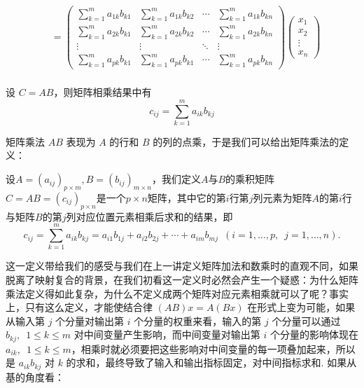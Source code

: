 \begin{align*}
    &= \begin{pmatrix}
        \sum_{k=1}^m a_{1k} b_{k1} & \sum_{k=1}^m a_{1k} b_{k2} & \cdots & \sum_{k=1}^m a_{1k} b_{kn} \\
        \sum_{k=1}^m a_{2k} b_{k1} & \sum_{k=1}^m a_{2k} b_{k2} & \cdots & \sum_{k=1}^m a_{2k} b_{kn} \\
        \vdots & \vdots & \ddots & \vdots \\
        \sum_{k=1}^m a_{pk} b_{k1} & \sum_{k=1}^m a_{pk} b_{k1} & \cdots & \sum_{k=1}^m a_{pk} b_{kn}
    \end{pmatrix} \begin{pmatrix}
        x_1 \\ x_2 \\ \vdots \\ x_n
    \end{pmatrix}\\
\end{align*}

设 $C = AB$，则矩阵相乘结果中有
\[
    c_{ij} = \sum_{k=1}^m a_{ik} b_{kj}
\]

矩阵乘法 $AB$ 表现为 $A$ 的行和 $B$ 的列的点乘，于是我们可以给出矩阵乘法的定义：
\begin{definition}{}{}
    设$A=(a_{ij})_{p\times m},B=(b_{ij})_{m\times n}$，我们定义$A$与$B$的乘积矩阵$C=AB=(c_{ij})_{p\times n}$是一个$p\times n$矩阵，其中它的第$i$行第$j$列元素为矩阵$A$的第$i$行与矩阵$B$的第$j$列对应位置元素相乘后求和的结果，即
    \[
        c_{ij}
        =\sum_{k=1}^m a_{ik} b_{kj}
        =a_{i1}b_{1j}+a_{i2}b_{2j}+\cdots+a_{im}b_{mj}\enspace(i=1,\ldots,p,\enspace j=1,\ldots,n).
    \]
\end{definition}

这一定义带给我们的感受与我们在上一讲定义矩阵加法和数乘时的直观不同，如果脱离了映射复合的背景，在我们初看这一定义时必然会产生一个疑惑：为什么矩阵乘法定义得如此复杂，为什么不定义成两个矩阵对应元素相乘就可以了呢？事实上，只有这么定义，才能使结合律 $(AB)x = A(Bx)$ 在形式上变为可能，如果从输入第 $j$ 个分量对输出第 $i$ 个分量的权重来看，输入的第 $j$ 个分量可以通过 $b_{kj}, \enspace 1\leqslant k\leqslant m$ 对中间变量产生影响，而中间变量对输出第 $i$ 个分量的影响体现在 $a_{ik}, \enspace 1\leqslant k\leqslant m$，相乘时就必须要把这些影响对中间变量的每一项叠加起来，所以是 $a_{ik} b_{kj}$ 对 $k$ 的求和，最终导致了输入和输出指标固定，对中间指标求和. 如果从基的角度看：

